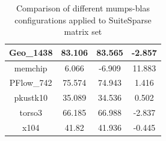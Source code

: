\begin{table}[h!]
\begin{tabular}{|c|c|c|c|}
Geo\_1438                                             & 83.106                                                                                                  & 83.565                                                                                               & -2.857                                                                                                  \\ \hline
memchip                                               & 6.066                                                                                                   & -6.909                                                                                               & 11.883                                                                                                  \\ \hline
PFlow\_742                                            & 75.574                                                                                                  & 74.943                                                                                               & 1.416                                                                                                   \\ \hline
pkustk10                                              & 35.089                                                                                                  & 34.536                                                                                               & 0.502                                                                                                   \\ \hline
torso3                                                & 66.185                                                                                                  & 66.988                                                                                               & -2.837                                                                                                  \\ \hline
x104                                                  & 41.82                                                                                                   & 41.936                                                                                               & -0.445                                                                                                  \\ \hline
\end{tabular}
\caption{Comparison of different \gls{mumps}-\gls{blas} configurations applied to SuiteSparse matrix set}
\label{table:mumps-blas-performance-gain-suitesprase}
\end{table}



